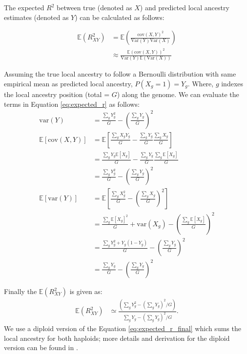 The expected $R^2$ between true (denoted as $X$) and predicted local ancestry estimates (denoted as $Y$) can be calculated as follows:

\begin{align}
    \mathbb{E}(R^2_{XY}) &= \mathbb{E} \left( \frac{\text{cov}(X, Y)^2}{\text{Var}(Y) \text{Var}(X)} \right) \\
              &\approx \frac{\mathbb{E}(\text{cov}(X, Y))^2}{\text{Var}(Y) \mathbb{E}(\text{Var}(X))}
\label{eq:expected_r}
\end{align}

Assuming the true local ancestry to follow a Bernoulli distribution with same empirical mean as predicted local ancestry, $P(X_g = 1) = Y_g$. Where, $g$ indexes the local ancestry position (total = $G$) along the genome. We can evaluate the terms in Equation \ref{eq:expected_r} as follows:
\begin{align}
\text{var}(Y) &= \frac{\sum_g Y_{g}^2}{G} - \left( \frac{\sum_g Y_{g}}{G} \right)^2 \nonumber \\ 
\mathbb{E}[\text{cov}(X, Y)] &= \mathbb{E} \left[ \frac{\sum_g X_{g} Y_{g}}{G} - \frac{\sum_g Y_{g}}{G} \frac{\sum_g X_{g}}{G} \right] \nonumber  \\
&= \frac{\sum_g Y_{g} \mathbb{E}[X_{g}]}{G} - \frac{\sum_g Y_{g}}{G} \frac{\sum_g \mathbb{E}[X_{g}]}{G} \nonumber \\
&= \frac{\sum_g Y_{g}^2}{G} - \left( \frac{\sum_g Y_{g}}{G} \right)^2 \nonumber \\
\mathbb{E}[\text{var}(Y)] &= \mathbb{E} \left[ \frac{\sum_g X_{g}^2}{G} - \left( \frac{\sum_g X_{g}}{G} \right)^2 \right] \nonumber  \\
&= \frac{\sum_g \mathbb{E}[X_{g}]^2}{G} + \text{var}(X_{g}) - \left( \frac{\sum_g \mathbb{E}[X_{g}]}{G} \right)^2 \nonumber  \\
&= \frac{\sum_g Y_{g}^2 + Y_{g} (1 - Y_{g})}{G} - \left( \frac{\sum_g Y_{g}}{G} \right)^2 \nonumber  \\
&= \frac{\sum_g Y_{g}}{G} - \left( \frac{\sum_g Y_{g}}{G} \right)^2
\end{align}

Finally the $\mathbb{E}(R^2_{XY})$ is given as:
\begin{align}
    \mathbb{E}(R^2_{XY}) &\simeq \frac{\left( \sum_g Y_{g}^2 - \left( \sum_g Y_{g} \right)^2/G \right)}{\sum_g Y_{g} - \left( \sum_g Y_{g} \right)^2/G}.
\label{eq:expected_r_final}
\end{align}
We use a diploid version of the Equation \ref{eq:expected_r_final} which sums the local ancestry for both haploids; more details and derivation for the diploid version can be found in \cite{salter2019fine}. 

